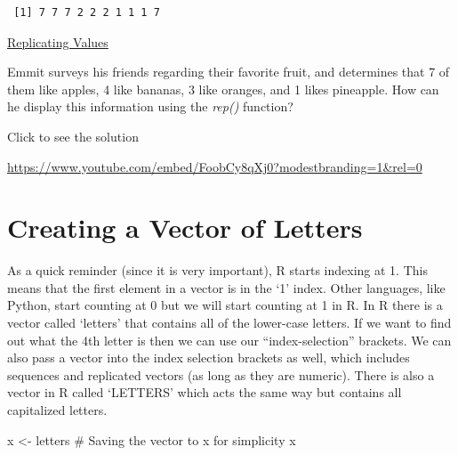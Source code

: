 \documentclass[
  letterpaper,
  DIV=11,
  numbers=noendperiod]{scrreprt}
\newenvironment{Shaded}{\begin{snugshade}}{\end{snugshade}}
\newcommand{\CommentTok}[1]{\textcolor[rgb]{0.37,0.37,0.37}{#1}}
\newcommand{\NormalTok}[1]{\textcolor[rgb]{0.00,0.23,0.31}{#1}}
\newcommand{\OtherTok}[1]{\textcolor[rgb]{0.00,0.23,0.31}{#1}}
\begin{document}
\begin{verbatim}
 [1] 7 7 7 2 2 2 1 1 1 7
\end{verbatim}

\begin{watch}{}{}
    \href{https://youtu.be/OGBhjbDChgQ}{Replicating Values}
\end{watch}

\begin{tcolorbox}[enhanced jigsaw, colframe=quarto-callout-tip-color-frame, colback=white, breakable, rightrule=.15mm, title=\textcolor{quarto-callout-tip-color}{\faLightbulb}\hspace{0.5em}{Try it Out}, bottomtitle=1mm, toptitle=1mm, titlerule=0mm, left=2mm, coltitle=black, colbacktitle=quarto-callout-tip-color!10!white, leftrule=.75mm, opacitybacktitle=0.6, bottomrule=.15mm, opacityback=0, arc=.35mm, toprule=.15mm]

Emmit surveys his friends regarding their favorite fruit, and determines
that 7 of them like apples, 4 like bananas, 3 like oranges, and 1 likes
pineapple. How can he display this information using the \emph{rep()}
function?

Click to see the solution

\url{https://www.youtube.com/embed/FoobCy8qXj0?modestbranding=1&rel=0}

\end{tcolorbox}

\section{Creating a Vector of
Letters}\label{creating-a-vector-of-letters}

As a quick reminder (since it is very important), R starts indexing at
1. This means that the first element in a vector is in the `1' index.
Other languages, like Python, start counting at 0 but we will start
counting at 1 in R. In R there is a vector called `letters' that
contains all of the lower-case letters. If we want to find out what the
4th letter is then we can use our ``index-selection'' brackets. We can
also pass a vector into the index selection brackets as well, which
includes sequences and replicated vectors (as long as they are numeric).
There is also a vector in R called `LETTERS' which acts the same way but
contains all capitalized letters.

\begin{Shaded}
\begin{Highlighting}[]
\NormalTok{x }\OtherTok{\textless{}{-}}\NormalTok{ letters }\CommentTok{\# Saving the vector to \textquotesingle{}x\textquotesingle{} for simplicity}
\NormalTok{x}
\end{Highlighting}
\end{Shaded}
\end{document}
